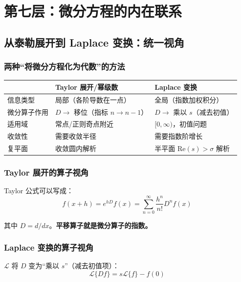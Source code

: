 \section{第七层：微分方程的内在联系}

\subsection{从泰勒展开到 Laplace 变换：统一视角}

\subsubsection{两种“将微分方程化为代数”的方法}

\begin{center}
\begin{tabular}{p{2cm}p{5cm}p{5cm}}
\toprule
 & \textbf{Taylor 展开/幂级数} & \textbf{Laplace 变换} \\
\midrule
信息类型 & 局部（各阶导数在一点） & 全局（指数加权积分） \\
微分算子作用 & $D \to$ 移位（指标 $n \to n-1$） & $D \to$ 乘以 $s$（减去初值） \\
适用域 & 常点/正则奇点附近 & $[0,\infty)$，初值问题 \\
收敛性 & 需要收敛半径 & 需要指数阶增长 \\
复平面 & 收敛圆内解析 & 半平面 $\text{Re}(s) > \sigma$ 解析 \\
\bottomrule
\end{tabular}
\end{center}

\subsubsection{Taylor 展开的算子视角}

Taylor 公式可以写成：
\[
f(x + h) = e^{hD}f(x) = \sum_{n=0}^{\infty} \frac{h^n}{n!}D^n f(x)
\]

其中 $D = d/dx$。\textbf{平移算子就是微分算子的指数。}

\subsubsection{Laplace 变换的算子视角}

$\mathcal{L}$ 将 $D$ 变为“乘以 $s$”（减去初值项）：
\[
\mathcal{L}\{Df\} = s\mathcal{L}\{f\} - f(0)
\]

